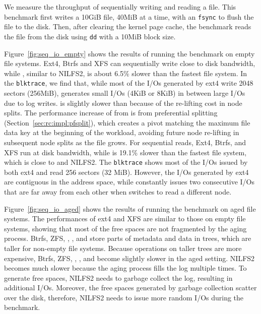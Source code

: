 We measure the throughput of sequentially writing and reading a file.
This benchmark first writes a 10GiB file, 40MiB at a time, with an
\texttt{fsync} to flush the file to the disk.
Then, after clearing the kernel page cache, the benchmark reads the file from
the disk using \texttt{dd} with a 10MiB block size.

Figure~\ref{fig:seq_io_empty} shows the results of running the benchmark on empty
file systems.
Ext4, Btrfs and XFS can sequentially write close to disk bandwidth,
while \betrfsFive, similar to NILFS2,
is about 6.5\% slower than the fastest file system.
In the \texttt{blktrace}, we find that,
while most of the I/Os generated by ext4 write 2048 sectors (256MiB),
\betrfsFive generates small I/Os (4KiB or 8KiB) in between large I/Os
due to log writes.
\betrfsFour is slightly slower than \betrfsThree because of the re-lifting cost
in node splits.
The performance increase of \betrfsFive from \betrfsFour is from preferential
splitting (Section~\ref{sec:rc:impl:pfsplit}),
which creates a pivot matching the maximum file data key at the
beginning of the workload, avoiding future node re-lifting in subsequent node
splits as the file grows.
For sequential reads, Ext4, Btrfs, and XFS run at disk bandwidth,
while \betrfsFive is 19.1\% slower than the fastest file system,
which is close to \betrfsFour and NILFS2.
The \texttt{blktrace} shows most of the I/Os issued by both
ext4 and \betrfsFive read 256 sectors (32 MiB).
However, the I/Os generated by ext4 are contiguous in the address space,
while \betrfsFive constantly issues two consecutive I/Os that are far away from
each other when \betrfsFive switches to read a different node.

Figure~\ref{fig:seq_io_aged} shows the results of running the benchmark on
aged file systems.
The performances of ext4 and XFS are similar to those on empty file systems,
showing that most of the free spaces are not fragmented by the aging process.
Btrfs, ZFS, \betrfsThree, \betrfsFour, and \betrfsFive store parts of metadata
and data in trees, which are taller for non-empty file systems.
Because operations on taller trees are more expensive,
Btrfs, ZFS, \betrfsThree, \betrfsFour, and \betrfsFive become slightly slower
in the aged setting.
NILFS2 becomes much slower because the aging process fills the log multiple
times.
To generate free spaces, NILFS2 needs to garbage collect the log,
resulting in additional I/Os.
Moreover, the free spaces generated by garbage collection scatter over the disk,
therefore, NILFS2 needs to issue more random I/Os during the benchmark.

